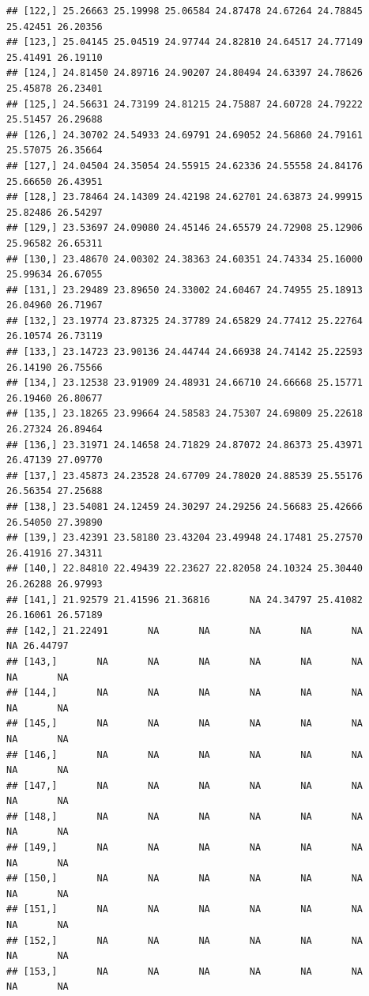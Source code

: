 \documentclass{article}\usepackage[]{graphicx}\usepackage[]{color}
\makeatletter
\newenvironment{kframe}{%
 \def\at@end@of@kframe{}%
 \ifinner\ifhmode%
  \def\at@end@of@kframe{\end{minipage}}%
  \begin{minipage}{\columnwidth}%
 \fi\fi%
 \def\FrameCommand##1{\hskip\@totalleftmargin \hskip-\fboxsep
 \colorbox{shadecolor}{##1}\hskip-\fboxsep
     \hskip-\linewidth \hskip-\@totalleftmargin \hskip\columnwidth}%
 \MakeFramed {\advance\hsize-\width
   \@totalleftmargin\z@ \linewidth\hsize
   \@setminipage}}%
 {\par\unskip\endMakeFramed%
 \at@end@of@kframe}
\newenvironment{knitrout}{}{} %
\makeatother
\begin{document}
\begin{knitrout}
\begin{kframe}
\begin{verbatim}
## [122,] 25.26663 25.19998 25.06584 24.87478 24.67264 24.78845 25.42451 26.20356
## [123,] 25.04145 25.04519 24.97744 24.82810 24.64517 24.77149 25.41491 26.19110
## [124,] 24.81450 24.89716 24.90207 24.80494 24.63397 24.78626 25.45878 26.23401
## [125,] 24.56631 24.73199 24.81215 24.75887 24.60728 24.79222 25.51457 26.29688
## [126,] 24.30702 24.54933 24.69791 24.69052 24.56860 24.79161 25.57075 26.35664
## [127,] 24.04504 24.35054 24.55915 24.62336 24.55558 24.84176 25.66650 26.43951
## [128,] 23.78464 24.14309 24.42198 24.62701 24.63873 24.99915 25.82486 26.54297
## [129,] 23.53697 24.09080 24.45146 24.65579 24.72908 25.12906 25.96582 26.65311
## [130,] 23.48670 24.00302 24.38363 24.60351 24.74334 25.16000 25.99634 26.67055
## [131,] 23.29489 23.89650 24.33002 24.60467 24.74955 25.18913 26.04960 26.71967
## [132,] 23.19774 23.87325 24.37789 24.65829 24.77412 25.22764 26.10574 26.73119
## [133,] 23.14723 23.90136 24.44744 24.66938 24.74142 25.22593 26.14190 26.75566
## [134,] 23.12538 23.91909 24.48931 24.66710 24.66668 25.15771 26.19460 26.80677
## [135,] 23.18265 23.99664 24.58583 24.75307 24.69809 25.22618 26.27324 26.89464
## [136,] 23.31971 24.14658 24.71829 24.87072 24.86373 25.43971 26.47139 27.09770
## [137,] 23.45873 24.23528 24.67709 24.78020 24.88539 25.55176 26.56354 27.25688
## [138,] 23.54081 24.12459 24.30297 24.29256 24.56683 25.42666 26.54050 27.39890
## [139,] 23.42391 23.58180 23.43204 23.49948 24.17481 25.27570 26.41916 27.34311
## [140,] 22.84810 22.49439 22.23627 22.82058 24.10324 25.30440 26.26288 26.97993
## [141,] 21.92579 21.41596 21.36816       NA 24.34797 25.41082 26.16061 26.57189
## [142,] 21.22491       NA       NA       NA       NA       NA       NA 26.44797
## [143,]       NA       NA       NA       NA       NA       NA       NA       NA
## [144,]       NA       NA       NA       NA       NA       NA       NA       NA
## [145,]       NA       NA       NA       NA       NA       NA       NA       NA
## [146,]       NA       NA       NA       NA       NA       NA       NA       NA
## [147,]       NA       NA       NA       NA       NA       NA       NA       NA
## [148,]       NA       NA       NA       NA       NA       NA       NA       NA
## [149,]       NA       NA       NA       NA       NA       NA       NA       NA
## [150,]       NA       NA       NA       NA       NA       NA       NA       NA
## [151,]       NA       NA       NA       NA       NA       NA       NA       NA
## [152,]       NA       NA       NA       NA       NA       NA       NA       NA
## [153,]       NA       NA       NA       NA       NA       NA       NA       NA

\end{verbatim}
\end{kframe}
\end{knitrout}
\end{document}
